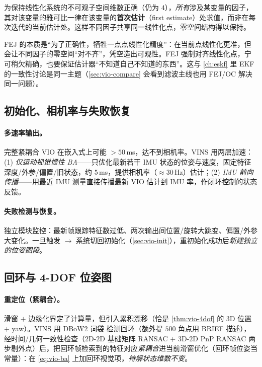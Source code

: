\begin{theorem}\label{thm:vio-fej}
为保持线性化系统的不可观子空间维数正确（仍为 $4$），\emph{所有}涉及某变量的因子，其对该变量的雅可比一律在该变量的\textbf{首次估计}（first estimate）处求值，而非在每次迭代的当前估计处\cite{huang2019vins}。这样不同因子共享同一线性化点，零空间结构得以保持。
\end{theorem}

\begin{insight}
FEJ 的本质是“为了正确性，牺牲一点点线性化精度”：在当前点线性化更准，但会让不同因子的零空间“对不齐”，凭空造出可观性。FEJ 强制对齐线性化点，宁可稍欠精确，也要保证估计器“不知道自己不知道的东西”。这与 \cref{ch:eskf} 里 EKF 的一致性讨论是同一主题（\cref{sec:vio-compare} 会看到滤波主线也用 FEJ/OC 解决同一问题）。
\end{insight}

\subsection{初始化、相机率与失败恢复}
\label{sec:vio-opt-misc}

\paragraph{多速率输出。}
完整紧耦合 VIO 在嵌入式上可能 $>50\,$ms，达不到相机率\cite{qin2018vins}。VINS 用两层加速：(1) \emph{仅运动视觉惯性 BA}——只优化最新若干 IMU 状态的位姿与速度，固定特征深度/外参/偏置/旧状态，约 $5\,$ms，提供相机率（$\approx30\,$Hz）估计；(2) \emph{IMU 前向传播}——用最近 IMU 测量直接传播最新 VIO 估计到 IMU 率，作闭环控制的状态反馈。

\paragraph{失败检测与恢复。}
独立模块监控：最新帧跟踪特征数过低、两次输出间位置/旋转大跳变、偏置/外参大变化。一旦触发 $\to$ 系统切回初始化（\cref{sec:vio-init}），重初始化成功后\emph{新建独立的位姿图段}。

\subsection{回环与 4-DOF 位姿图}
\label{sec:vio-opt-loop}

\paragraph{重定位（紧耦合）。}
滑窗 $+$ 边缘化界定了计算量，但引入累积漂移（恰是 \cref{thm:vio-4dof} 的 $3$D 位置 $+$ yaw）。VINS 用 DBoW2 词袋\cite{galvez2012bags} 检测回环（额外提 $500$ 角点用 BRIEF 描述），经时间/几何一致性检查（$2$D-$2$D 基础矩阵 RANSAC $+$ $3$D-$2$D PnP RANSAC 两步剔外点）后，把回环帧检索到的特征对应\emph{紧耦合}进当前滑窗优化（回环帧位姿当常量）：在 \cref{eq:vio-ba} 上加回环视觉项，\emph{待解状态维数不变}。

